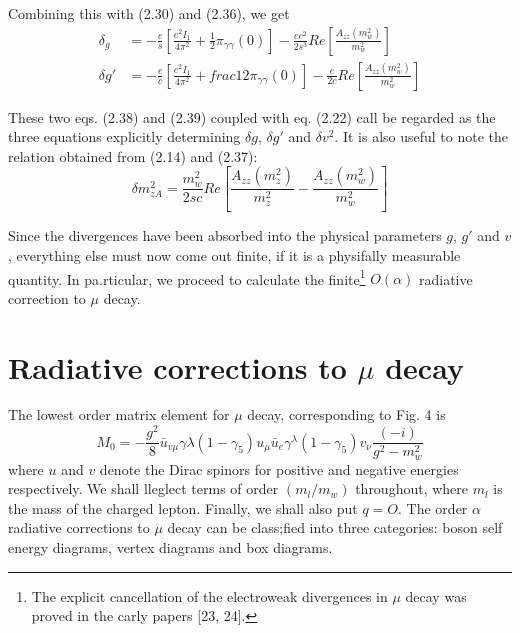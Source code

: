 {Combining this with (2.30) and (2.36), we get
\begin{align*}
\delta_{g} &= - \frac{e}{s} \left[\frac{e^{2}I_{1}}{4 \pi^{2}} + \frac{1}{2} \pi_{\gamma \gamma} (0)\right]- \frac{e c^{2}}{2 s^{3}} Re \left[\frac{A_{zz}(m^{2}_{w})}{m^{2}_{w}} \right]\tag{2.38}\\
\delta g' &= - \frac{e}{c} \left[\frac{e^{2}I_{1}}{4 \pi^{2}} + frac{1}{2} \pi_{\gamma \gamma} (0)\right] - \frac{e}{2c} Re \left[\frac{A_{zz}(m^{2}_{w})}{m^{2}_{w}} \right]\tag{2.39}
\end{align*}

These two eqs. (2.38) and (2.39) coupled with eq. (2.22) call be regarded as
the three equations explicitly determining $\delta g$, $\delta g'$ and $\delta v^{2}$. It is also useful to
note the relation obtained from (2.14) and (2.37):
\begin{equation}
\delta m^{2}_{zA} = \frac{m^{2}_{w}}{2sc} Re \left[\frac{A_{zz}(m^{2}_{z})}{m^{2}_{z}} - \frac{A_{zz}(m^{2}_{w})}{m^{2}_{w}} \right]\tag{2.40}
\end{equation} 

Since the divergences have been absorbed into the physical parameters $g$, $g'$
and $v$, everything else must now come out finite, if it is a physifally measurable quantity. In pa.rticular, we proceed to calculate the finite\footnote{The explicit cancellation of the electroweak divergences in $\mu$ decay was proved in the carly papers [23, 24].} $O(\alpha)$ radiative correction to $\mu$ decay. 

\section{Radiative corrections to $\mu$ decay}

The lowest order matrix element for $\mu$ decay, corresponding to Fig. 4 is 
\begin{equation*}
M_{0} = - \frac{g^{2}}{8} \bar{u}_{v\mu}\gamma \lambda (1-\gamma_{5})u_{\mu} \bar{u}_{e} \gamma^{\lambda}(1-\gamma_{5})v_{\nu} \frac{(-i)}{g^{2}-m^{2}_{w}}\tag{3.1}
\end{equation*}
where $u$ and $v$ denote the Dirac spinors for positive and negative energies respectively. We shall lleglect terms of order $(m_{l}/m_{w})$ throughout, where $m_{l}$ is
the mass of the charged lepton. Finally, we shall also put $q = O$. The order $\alpha$
radiative corrections to $\mu$ decay can be class;fied into three categories: boson
self energy diagrams, vertex diagrams and box diagrams. 

}
